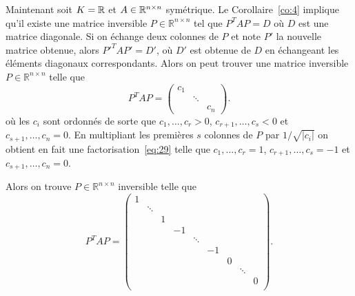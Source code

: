 



Maintenant soit $K = \mathbb{R}$  et $A \in \mathbb{R}^{n \times n}$ symétrique. Le Corollaire~\ref{co:4} implique qu'il existe une matrice inversible $P ∈ ℝ^{n \times n}$ tel que $P^T A P = D$ où $D$ est une matrice diagonale. Si on échange deux colonnes de $P$ et note $P'$ la nouvelle matrice obtenue, alors $P'^T A P' = D'$, où $D'$ est obtenue de $D$ en échangeant les éléments diagonaux correspondants. Alors on peut trouver une matrice inversible $P ∈ ℝ^{n ×n}$ telle que 
\begin{equation}
  \label{eq:29}
  P^T A {P} =
    \begin{pmatrix}
      c_1\\
      & \ddots \\
      && c_n
    \end{pmatrix}. 
\end{equation}
où les  $c_i$ sont ordonnés de sorte que  $c_1,\dots, c_r >0$, $c_{r+1},\dots ,c_s<0$ et $c_{s+1},\dots , c_n = 0$. En multipliant les premières $s$ colonnes de $P$ par $1/ \sqrt{|c_i|}$ on obtient en fait une factorisation~\eqref{eq:29} telle que 
 $c_1,\dots, c_r =1$, $c_{r+1},\dots ,c_s=-1$ et $c_{s+1},\dots , c_n = 0$. 

Alors on trouve  $P ∈ ℝ^{n ×n}$ inversible telle que 
\begin{equation}
  \label{eq:5}
  P^T A P =
  \begin{pmatrix}
    1 &   \\
      & \ddots &  \\
      &        & 1 \\
      &        &  & -1 \\
      &        &  &    & \ddots \\
      &        &  &    &        & -1 \\
      &        &  &    &        &    & 0 \\
      &        &  &    &        &    &   & \ddots  \\
      &        &  &    &        &    &   &        & 0  \\

  \end{pmatrix}.
\end{equation}


